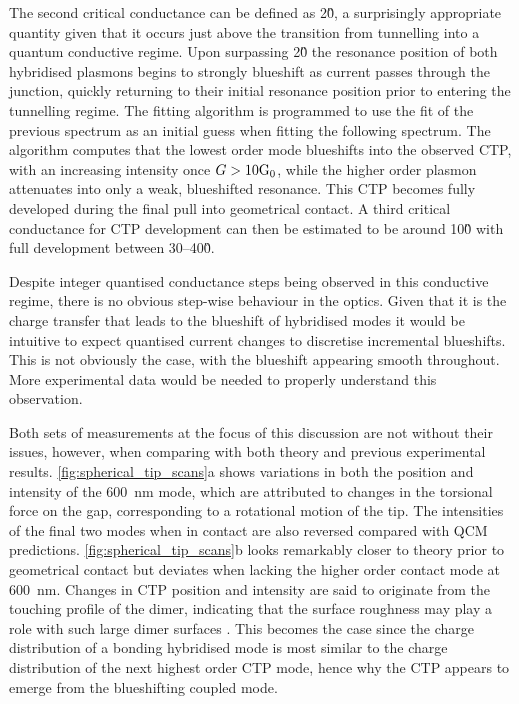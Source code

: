 \documentclass[a4paper]{article}
\begin{document}
The second critical conductance can be defined as 2\G0, a surprisingly appropriate quantity given that it occurs just above the transition from tunnelling into a quantum conductive regime. Upon surpassing 2\G0 the resonance position of both hybridised plasmons begins to strongly blueshift as current passes through the junction, quickly returning to their initial resonance position prior to entering the tunnelling regime. The fitting algorithm is programmed to use the fit of the previous spectrum as an initial guess when fitting the following spectrum. The algorithm computes that the lowest order mode blueshifts into the observed CTP, with an increasing intensity once $G>10\mathrm{G_{0}}$, while the higher order plasmon attenuates into only a weak, blueshifted resonance. %
This CTP becomes fully developed during the final pull into geometrical contact. A third critical conductance for CTP development can then be estimated to be around 10\G0 with full development between 30--40\G0.

Despite integer quantised conductance steps being observed in this conductive regime, there is no obvious step-wise behaviour in the optics. Given that it is the charge transfer that leads to the blueshift of hybridised modes it would be intuitive to expect quantised current changes to discretise incremental blueshifts. This is not obviously the case, with the blueshift appearing smooth throughout. More experimental data would be needed to properly understand this observation.


Both sets of measurements at the focus of this discussion are not without their issues, however, when comparing with both theory and previous experimental results. \autoref{fig:spherical_tip_scans}a shows variations in both the position and intensity of the \SI{600}{nm} mode, which are attributed to changes in the torsional force on the gap, corresponding to a rotational motion of the tip. The intensities of the final two modes when in contact are also reversed compared with QCM predictions. \autoref{fig:spherical_tip_scans}b looks remarkably closer to theory prior to geometrical contact but deviates when lacking the higher order contact mode at \SI{600}{nm}. Changes in CTP position and intensity are said to originate from the touching profile of the dimer, indicating that the surface roughness may play a role with such large dimer surfaces \cite{zuloaga2009}. This becomes the case since the charge distribution of a bonding hybridised mode is most similar to the charge distribution of the next highest order CTP mode, hence why the CTP appears to emerge from the blueshifting coupled mode.
\end{document}
